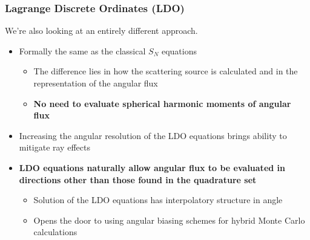 \documentclass[xcolor=x11names,compress]{beamer}
\renewcommand{\(}{\begin{columns}}
\renewcommand{\)}{\end{columns}}
\newcommand{\<}[1]{\begin{column}{#1}}
\renewcommand{\>}{\end{column}}
\begin{document}
\begin{frame}[fragile]

  \frametitle{Lagrange Discrete Ordinates (LDO) \cite{Ahrens2015}}

   We're also looking at an entirely different approach.    
\pause
\begin{itemize}
\item{Formally the same as the classical $S_N$ equations}
	\begin{itemize}
	\pause
	\item{The difference lies in how the scattering source is calculated and in the representation of the angular flux}
	\pause
	\item{\textbf{No need to evaluate spherical harmonic moments of angular flux}}
	\end{itemize}
\pause
\item{Increasing the angular resolution of the LDO equations brings ability to mitigate ray effects}
\pause
\item{\textbf{LDO equations naturally allow angular flux to be evaluated in directions other than those found in the quadrature set}}
	\begin{itemize}
	\pause
	\item{Solution of the LDO equations has interpolatory structure in angle}
	\pause
	\item{Opens the door to using angular biasing schemes for hybrid Monte Carlo calculations}
	\end{itemize}
\end{itemize}

\end{frame}
\end{document}
